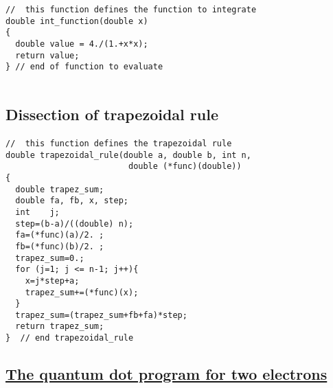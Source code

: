 \begin{verbatim}
//  this function defines the function to integrate
double int_function(double x)
{
  double value = 4./(1.+x*x);
  return value;
} // end of function to evaluate


\end{verbatim}



\subsection*{Dissection of trapezoidal rule}

\paragraph{}



















\begin{verbatim}
//  this function defines the trapezoidal rule
double trapezoidal_rule(double a, double b, int n, 
                         double (*func)(double))
{
  double trapez_sum;
  double fa, fb, x, step;
  int    j;
  step=(b-a)/((double) n);
  fa=(*func)(a)/2. ;
  fb=(*func)(b)/2. ;
  trapez_sum=0.;
  for (j=1; j <= n-1; j++){
    x=j*step+a;
    trapez_sum+=(*func)(x);
  }
  trapez_sum=(trapez_sum+fb+fa)*step;
  return trapez_sum;
}  // end trapezoidal_rule 

\end{verbatim}



\subsection*{\href{{https://github.com/CompPhysics/ComputationalPhysics2/blob/master/doc/Programs/ParallelizationMPI/MPIvmcqdot.cpp}}{The quantum dot program for two electrons}}

